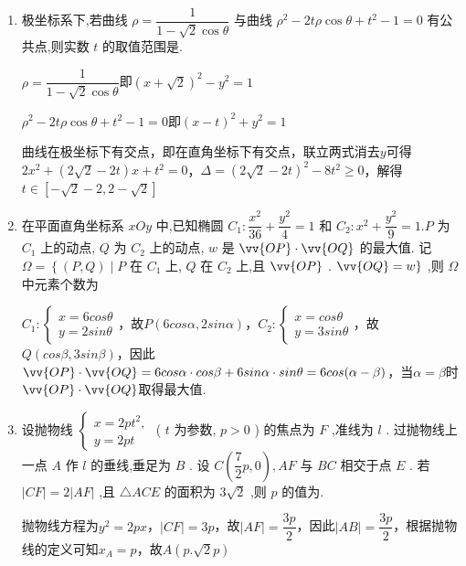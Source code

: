 \begin{enumerate}
    \begin{jieda}
        $C_1: (x-1)^2+y^2 = 1$，$C_2: y = x+1$
    \end{jieda}
    \item 极坐标系下,若曲线 $\rho  = \dfrac{1}{1 - \sqrt{2}\cos \theta }$ 与曲线 ${\rho }^{2} - {2t\rho }\cos \theta  + {t}^{2} - 1 = 0$ 有公共点,则实数 $t$ 的取值范围是.
    \begin{jieda}
        $\rho  = \dfrac{1}{1 - \sqrt{2}\cos \theta }$即$(x+\sqrt{2})^2 - y^2 = 1$
        
        ${\rho }^{2} - {2t\rho }\cos \theta  + {t}^{2} - 1 = 0$即$(x-t)^2+y^2 = 1$

        曲线在极坐标下有交点，即在直角坐标下有交点，联立两式消去$y$可得$2x^2+(2\sqrt{2}-2t)x+t^2=0$，$\Delta = (2\sqrt{2}-2t)^2-8t^2 \geq 0$，解得$t \in [-\sqrt{2}-2, 2-\sqrt{2}]$
    \end{jieda}
    \item 在平面直角坐标系 ${xOy}$ 中,已知椭圆 ${C}_{1} : \dfrac{{x}^{2}}{36} + \dfrac{{y}^{2}}{4} = 1$ 和 ${C}_{2} : {x}^{2} + \dfrac{{y}^{2}}{9} = 1.P$ 为 ${C}_{1}$ 上的动点, $Q$ 为 ${C}_{2}$ 上的动点, $w$ 是 $\vv{OP} \cdot  \vv{OQ}$ 的最大值. 记 $\Omega  = \left\{  {\left( {P,Q}\right)  \mid  P}\right.$ 在 ${C}_{1}$ 上, $Q$ 在 ${C}_{2}$ 上,且 $\vv{OP}$ . $\vv{OQ} = w\}$ ,则 $\Omega$ 中元素个数为 
    \begin{jieda}
        $C_1: \left\{\begin{array}{l}
             x = 6cos\theta  \\
             y = 2sin\theta
        \end{array} \right.$，故$P(6cos\alpha, 2sin\alpha)$，$C_2 : \left\{\begin{array}{l}
             x = cos\theta \\
             y = 3sin\theta
        \end{array}\right.$，故$Q(cos\beta, 3sin\beta)$，因此$\vv{OP} \cdot  \vv{OQ} = 6cos\alpha \cdot cos\beta + 6sin\alpha \cdot sin\theta = 6cos(\alpha - \beta)$，当$\alpha = \beta$时$\vv{OP} \cdot  \vv{OQ}$取得最大值.
    \end{jieda}
    \item 设抛物线 $\left\{  \begin{array}{l} x = {2p}{t}^{2}, \\  y = {2pt} \end{array}\right.$ ( $t$ 为参数, $p > 0$ ) 的焦点为 $F$ ,准线为 $l$ . 过抛物线上一点 $A$ 作 $l$ 的垂线,垂足为 $B$ . 设 $C\left( {\dfrac{7}{2}p,0}\right) ,{AF}$ 与 ${BC}$ 相交于点 $E$ . 若 $\left| {CF}\right|  = 2\left| {AF}\right|$ ,且 $\bigtriangleup {ACE}$ 的面积为 $3\sqrt{2}$ ,则 $p$ 的值为.
    \begin{jieda}
        抛物线方程为$y^2 = 2px$，$|CF| = 3p$，故$|AF| = \dfrac{3p}{2}$，因此$|AB| = \dfrac{3p}{2}$，根据抛物线的定义可知$x_A = p$，故$A(p. \sqrt{2}p)$


\end{jieda}
\end{enumerate}
